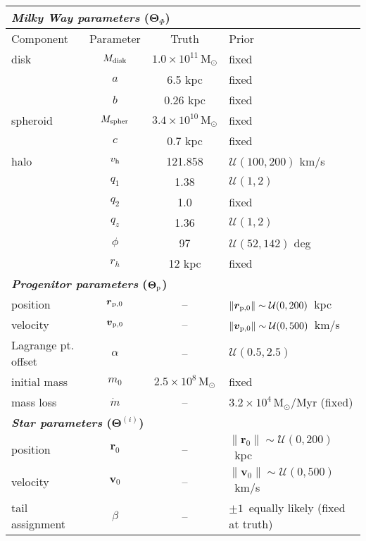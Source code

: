\documentclass[letterpaper,12pt,preprint]{aastex}
\newcommand{\msun}{\mathrm{M}_\odot}
\newcommand{\bs}{\boldsymbol}
\newcommand{\sat}{{\rm p}}
\newcommand{\vhalo}{v_{\rm h}}
\begin{document}
\begin{table*}[ht]
\begin{center}
	\begin{tabular}{l c c l} \toprule
		\multicolumn{4}{l}{{\bf \emph{Milky Way parameters} ($\bs{\Theta}_\Phi$)}} \\
		\toprule
		Component & Parameter & Truth & Prior \\\toprule
		disk & $M_{\rm disk}$ & $1.0\times10^{11}\,\msun$ & fixed \\ 
		& $a$ & 6.5 kpc & fixed\\
		& $b$ & 0.26 kpc & fixed\\
		\midrule
		spheroid & $M_{\rm spher}$ & $3.4\times10^{10}\,\msun$ & fixed\\ 
		& $c$ & 0.7 kpc & fixed\\
		\midrule
		halo & $\vhalo$ & 121.858 & $\mathcal{U}(100,200)$ km/s \\
		& $q_1$ & 1.38 & $\mathcal{U}(1,2)$\\
		& $q_2$ & 1.0 & fixed\\
		& $q_z$ & 1.36 & $\mathcal{U}(1,2)$\\
		& $\phi$ & 97 & $\mathcal{U}(52,142)$ deg\\
		& $r_h$ & 12 kpc & fixed\\
		\toprule
		\multicolumn{4}{l}{{\bf \emph{Progenitor parameters} ($\bs{\Theta}_\sat$)}} \\
		\toprule
		position & $\bs{r}_{\sat,0}$ & -- & $\|\bs{r}_{\sat,0}\|\sim\mathcal{U}(0,200)$~kpc \\
		velocity & $\bs{v}_{\sat,0}$ & -- & $\|\bs{v}_{\sat,0}\|\sim\mathcal{U}(0,500)$~km/s\\
		Lagrange pt. offset & $\alpha$ & -- & $\mathcal{U}(0.5, 2.5)$\\
		initial mass & $m_0$ & $2.5\times10^8\,\msun$ & fixed\\
		mass loss & $\dot{m}$ & -- & $3.2\times10^4\,\msun$/Myr (fixed)\\
		\toprule
		\multicolumn{4}{l}{{\bf \emph{Star parameters} ($\bs{\Theta}^{(i)}$)}} \\
		\toprule
		position & $\bs{r}_0$ & -- & $\|\bs{r}_0\|\sim\mathcal{U}(0,200)$~kpc \\
		velocity & $\bs{v}_0$ & -- & $\|\bs{v}_0\|\sim\mathcal{U}(0,500)$~km/s\\
		tail assignment & $\beta$ & -- & $\pm1$~equally likely (fixed at truth)\\ 
		\bottomrule
		\end{tabular}

\end{center}
\end{table*}
\end{document}

